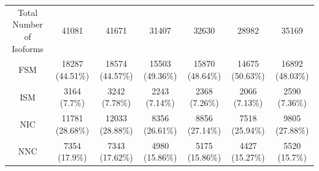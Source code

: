 \begin{landscape}
\begin{table}[]
{\begin{tabular}{@{}ccccccc@{}}
		Total Number of Isoforms            & 41081                                                                    & 41671                                                                    & 31407                                                                    & 32630                                                                   & 28982                                                                    & 35169                                                                    \\
		FSM                                 & 18287 (44.51\%)                                                          & 18574 (44.57\%)                                                          & 15503 (49.36\%)                                                          & 15870 (48.64\%)                                                         & 14675 (50.63\%)                                                          & 16892 (48.03\%)                                                          \\
		ISM                                 & 3164 (7.7\%)                                                             & 3242 (7.78\%)                                                            & 2243 (7.14\%)                                                            & 2368 (7.26\%)                                                           & 2066 (7.13\%)                                                            & 2590 (7.36\%)                                                            \\
		NIC                                 & 11781 (28.68\%)                                                          & 12033 (28.88\%)                                                          & 8356 (26.61\%)                                                           & 8856 (27.14\%)                                                          & 7518 (25.94\%)                                                           & 9805 (27.88\%)                                                           \\
		NNC                                 & 7354 (17.9\%)                                                            & 7343 (17.62\%)                                                           & 4980 (15.86\%)                                                           & 5175 (15.86\%)                                                          & 4427 (15.27\%)                                                           & 5520 (15.7\%)                                                            \\

\end{tabular}}
\end{table}
\end{landscape}
